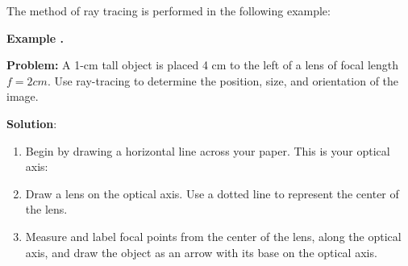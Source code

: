 The method of ray tracing is performed in the following example: 

\begin{mdframed}[backgroundcolor=blue!10!white]
	\begin{center}	
		\textbf{Example \thesection.}	
	\end{center}
	
	\textbf{Problem:} A 1-cm tall object is placed 4 cm to the left of a lens of focal length $f=2 \si{cm}$.  Use ray-tracing to determine the position, size, and orientation of the image.  

\textbf{Solution}: 


\begin{enumerate}
	\item Begin by drawing a horizontal line across your paper.  This is your optical axis: 
	\vspace{.5 in}
	\begin{center}
		

		\end{center}
	\vspace{.5 in}
	
	
	
	\item Draw a lens on the optical axis.  Use a dotted line to represent the center of the lens.  
	

	\begin{center}
		
		
	\end{center}

	\item Measure and label focal points from the center of the lens, along the optical axis, and draw the object as an arrow with its base on the optical axis.
		\begin{center}
		

\end{center}
\end{enumerate}
\end{mdframed}
